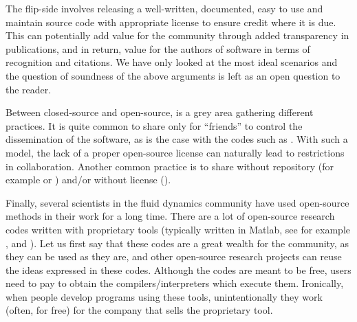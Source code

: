 The flip-side involves releasing a well-written, documented, easy to use and
maintain source code with appropriate license to ensure credit where it is due.
This can potentially add value for the community through added transparency in
publications, and in return, value for the authors of software in terms of
recognition and citations. We have only looked at the most ideal scenarios and
the question of soundness of the above arguments is left as an open question to
the reader.

Between closed-source and open-source, is a grey area gathering different
practices.
%
It is quite common to share only for ``friends'' to control the dissemination
of the software, as is the case with the codes such as
.
%
%
With such a model, the lack of a proper open-source license can naturally lead
to restrictions in collaboration.
%
Another common practice is to share without repository (for example
 or
) and/or
without license ().

Finally, several scientists in the fluid dynamics community have used
open-source methods in their work for a long time.
%
There are a lot of open-source research codes written with proprietary tools
(typically written in Matlab, see for example
,
 and
).
%
Let us first say that these codes are a great wealth for the community, as they
can be used as they are, and other open-source research projects can reuse 
the ideas expressed in these codes.
%
Although the codes are meant to be free, users need to pay to obtain the
compilers/interpreters which execute them. 
%
Ironically, when people develop programs using these tools, unintentionally
they work (often, for free) for the company that sells the proprietary tool.

